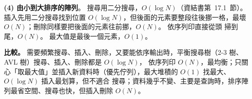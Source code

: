 \begin{pastsoln}
\textbf{(4) 由小到大排序的陣列}。 搜尋用二分搜尋，$O(\log N)$（資結書第~17.1~節）。 插入先用二分搜尋找到位置
$O(\log N)$，但後面的元素要整段往後挪一格，最壞 $O(N)$；刪除同樣要把後面的元素往前挪，$O(N)$。 依序列印直接從頭
掃到尾，$O(N)$。 最大值是最後一個元素，$O(1)$。

\textbf{比較。} 需要頻繁搜尋、插入、刪除，又要能依序輸出時，平衡搜尋樹（2-3 樹、AVL 樹）搜尋、插入、刪除都是 $O(\log N)$，
依序列印 $O(N)$，最均衡；只關心「取最大值」並插入新資料時（優先佇列），最大堆積的 $O(1)$ 找最大、$O(\log N)$ 插入最划算，但不適合
搜尋；資料幾乎不變、主要是查詢時，排序陣列最省空間、搜尋也快，但插入刪除 $O(N)$。
\end{pastsoln}
